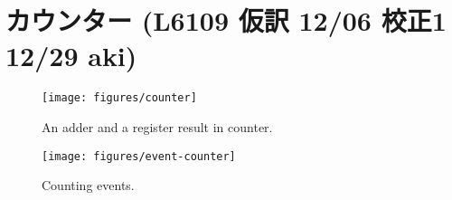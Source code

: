 \documentclass[%
    10pt,
    headinclude, footexclude,
    openright, %
    notitlepage,
    cleardoubleempty,
    headsepline,
    pointlessnumbers,
    bibtotoc, idxtotoc,
    ]{scrbook}
\newcommand{\scale}{0.7}
\newif\ifshoworiginal
\newif\ifshowtransfirst
\newif\ifshowtranssecond
\begin{document}
{{\section{カウンター (L6109 仮訳 12/06 校正1 12/29 aki)}
\fi

\label{sec:counter}

\begin{figure}
  \centering
  \texttt{[image: figures/counter]}
  \caption{An adder and a register result in counter.}
  \label{fig:counter}
\end{figure}

\ifshoworiginal
One of the most basic sequential circuits is a counter. In its simplest form, a counter is a register
where the output is connected to an adder and the adder's output is connected to the input
of the register. Figure~\ref{fig:counter} shows such a free-running counter.
\fi

\ifshowtransfirst %
最も基本的な順序回路の一つはカウンターです。
その最も単純な形態では、カウンタ出力は加算器に接続され、加算器の出力は、レジスタの入力に接続されるレジスタです。
図〜\ref{fig:counter}は、フリーランニングカウンタを示しています。
\fi

\ifshowtranssecond %
最も基本的な順序回路はカウンターです。
その最も単純な形態では、カウンタ出力が加算器に接続され、加算器の出力がレジスタの入力に接続されているレジスタです。
図~\ref{fig:counter}は、このようなフリーランニングカウンタを示しています。
\fi

\ifshoworiginal
A free-running counter with a 4-bit register counts from 0 to 15 and then wraps around
to 0 again. A counter shall also be reset to a known value.
\fi

\ifshowtransfirst %
0 15から4ビットのレジスタ数とフリーランニングカウンタと再び0にラップアラウンド。
カウンタは、既知の値にリセットしなければなりません。
\fi

\ifshowtranssecond %
4ビットのレジスタを持つフリーランニングカウンタは、0から15までカウントした後、再び0に折り返します。
また、カウンタは既知の値にリセットされなければなりません。
\fi


\begin{figure}
  \centering
  \texttt{[image: figures/event-counter]}
  \caption{Counting events.}
  \label{fig:event-counter}
\end{figure}

}}
\end{document}

